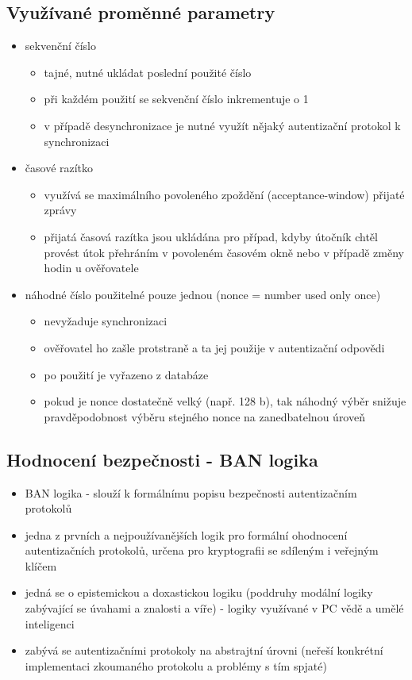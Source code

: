 \subsection{Využívané proměnné parametry}
\begin{itemize}
    \item sekvenční číslo
    \begin{itemize}
        \item tajné, nutné ukládat poslední použité číslo
        \item při každém použití se sekvenční číslo inkrementuje o 1
        \item v případě desynchronizace je nutné využít nějaký autentizační protokol k synchronizaci
    \end{itemize}
    \item časové razítko
    \begin{itemize}
        \item využívá se maximálního povoleného zpoždění (acceptance-window) přijaté zprávy
        \item přijatá časová razítka jsou ukládána pro případ, kdyby útočník chtěl provést útok přehráním v povoleném časovém okně nebo v případě změny hodin u ověřovatele
    \end{itemize}
    \item náhodné číslo použitelné pouze jednou (nonce = number used only once)
    \begin{itemize}
        \item nevyžaduje synchronizaci
        \item ověřovatel ho zašle protstraně a ta jej použije v autentizační odpovědi
        \item po použití je vyřazeno z databáze
        \item pokud je nonce dostatečně velký (např. 128 b), tak náhodný výběr snižuje pravděpodobnost výběru stejného nonce na zanedbatelnou úroveň
    \end{itemize}
\end{itemize}

\subsection{Hodnocení bezpečnosti - BAN logika}
\begin{itemize}
    \item BAN logika - slouží k formálnímu popisu bezpečnosti autentizačním protokolů
    \item jedna z prvních a nejpoužívanějších logik pro formální ohodnocení autentizačních protokolů, určena pro kryptografii se sdíleným i veřejným klíčem
    \item jedná se o epistemickou a doxastickou logiku (poddruhy modální logiky zabývající se úvahami a znalosti a víře) - logiky využívané v PC vědě a umělé inteligenci
    \item zabývá se autentizačními protokoly na abstrajtní úrovni (neřeší konkrétní implementaci zkoumaného protokolu a problémy s tím spjaté) \\
\end{itemize}

